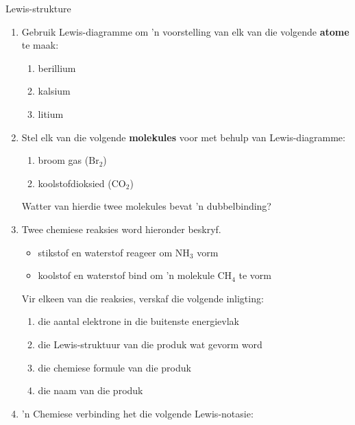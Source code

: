             \begin{exercises}{Lewis-strukture}
{
            \nopagebreak
      \label{m38701*id140889}\begin{enumerate}[noitemsep, label=\textbf{\arabic*}. ] 
            \label{m38701*uid23}\item Gebruik Lewis-diagramme om  'n voorstelling van elk van die volgende \textbf{atome} te maak:
\label{m38701*id140910}\begin{enumerate}[noitemsep, label=\textbf{\alph*}. ] 
            \label{m38701*uid24}\item berillium
\label{m38701*uid25}\item kalsium
\label{m38701*uid26}\item litium
\end{enumerate}
                \label{m38701*uid27}\item  Stel elk van die volgende \textbf{molekules} voor met behulp van Lewis-diagramme:
\label{m38701*id140969}\begin{enumerate}[noitemsep, label=\textbf{\alph*}. ] 
            \label{m38701*uid28}\item broom gas ($\text{Br}{}_{2}$)
\label{m38701*uid29}\item koolstofdioksied ($\text{CO}{}_{2}$)
\end{enumerate}
Watter van hierdie twee molekules bevat  'n dubbelbinding?
\label{m38701*uid31}\item Twee chemiese reaksies word hieronder beskryf.
\label{m38701*id141048}\begin{itemize}[noitemsep]
            \label{m38701*uid32}\item stikstof en waterstof reageer om $\text{NH}_{3}$ vorm
\label{m38701*uid33}\item koolstof en waterstof bind om  'n molekule $\text{CH}_{4}$ te vorm
\end{itemize}
Vir elkeen van die reaksies, verskaf die volgende inligting:
\label{m38701*id141106}\begin{enumerate}[noitemsep, label=\textbf{\alph*}. ] 
\item die aantal elektrone in die buitenste energievlak
\label{m38701*uid35}\item die Lewis-struktuur van die produk wat gevorm word
\label{m38701*uid36}\item die chemiese formule van die produk
\label{m38701*uid37}\item die naam van die produk
\end{enumerate}
                \label{m38701*uid38}\item  'n Chemiese verbinding het die volgende Lewis-notasie:

\end{enumerate}}
\end{exercises}
